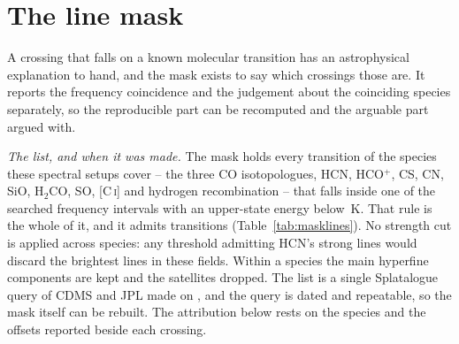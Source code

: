 \section{The line mask}
\label{app:linemask}

A crossing that falls on a known molecular transition has an astrophysical
explanation to hand, and the mask exists to say which crossings those are. It
reports the frequency coincidence and the judgement about the coinciding
species separately, so the reproducible part can be recomputed and the
arguable part argued with.

\emph{The list, and when it was made.} The mask holds every transition of the
\FrNSpec{} species these spectral setups cover -- the three CO isotopologues,
HCN, HCO$^{+}$, CS, CN, SiO, H$_2$CO, SO, [C\,\textsc{i}] and hydrogen
recombination -- that falls inside one of the \McNIsland{} searched frequency
intervals with an upper-state energy below \McEuMax\,K. That rule is the whole
of it, and it admits \FrNTrans{} transitions (Table~\ref{tab:masklines}).
No strength cut is applied across species: any threshold admitting HCN's
strong lines would discard the brightest lines in these fields. Within a
species the main hyperfine components are kept and the satellites
dropped. The list is a single Splatalogue query
\citep{Splatalogue2007} of CDMS and JPL \citep{Pickett1998,CDMS2005} made on
\MkListDate{}, and the query is dated and repeatable, so the mask itself can
be rebuilt. The attribution below rests on the species and the offsets
reported beside each crossing.

